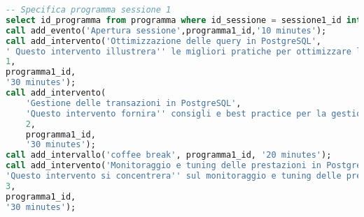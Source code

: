 \begin{lstlisting}[language=SQL, style=mystyle,caption={Conferenza PGConf NPL}]
-- Specifica programma sessione 1
select id_programma from programma where id_sessione = sessione1_id into programma1_id;
call add_evento('Apertura sessione',programma1_id,'10 minutes');
call add_intervento('Ottimizzazione delle query in PostgreSQL',
' Questo intervento illustrera'' le migliori pratiche per ottimizzare le query in PostgreSQL, inclusi suggerimenti per la scrittura di query efficienti e l''utilizzo degli indici corretti.',
1,
programma1_id,
'30 minutes');
call add_intervento(
    'Gestione delle transazioni in PostgreSQL',
    'Questo intervento fornira'' consigli e best practice per la gestione delle transazioni in PostgreSQL, comprese le strategie di commit e rollback, il controllo della concorrenza e l''utilizzo di blocchi di transazioni.',
    2,
    programma1_id,
    '30 minutes');
call add_intervallo('coffee break', programma1_id, '20 minutes');
call add_intervento('Monitoraggio e tuning delle prestazioni in PostgreSQL',
'Questo intervento si concentrera'' sul monitoraggio e tuning delle prestazioni in PostgreSQL, presentando strumenti e tecniche per l''identificazione e risoluzione dei problemi di performance.',
3,
programma1_id,
'30 minutes');


\end{lstlisting}
